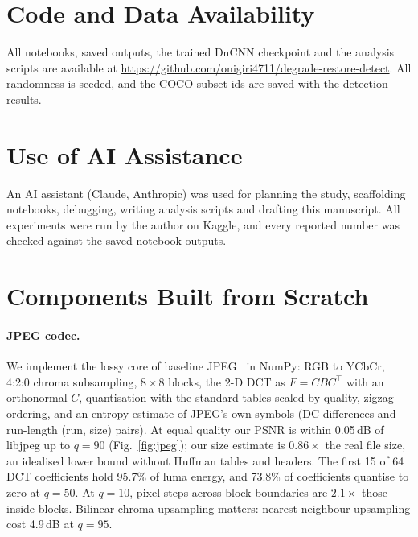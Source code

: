 \documentclass[11pt]{article}
\newcommand{\figref}[1]{Fig.~\ref{#1}}
\begin{document}
\section*{Code and Data Availability}
All notebooks, saved outputs, the trained DnCNN checkpoint and the analysis scripts are available at \url{https://github.com/onigiri4711/degrade-restore-detect}. All randomness is seeded, and the COCO subset ids are saved with the detection results.

\section*{Use of AI Assistance}
An AI assistant (Claude, Anthropic) was used for planning the study, scaffolding notebooks, debugging, writing analysis scripts and drafting this manuscript. All experiments were run by the author on Kaggle, and every reported number was checked against the saved notebook outputs.




\clearpage
\appendix

\section{Components Built from Scratch}
\label{app:scratch}

\paragraph{JPEG codec.} We implement the lossy core of baseline JPEG~\citep{wallace1992jpeg} in NumPy: RGB to YCbCr, 4:2:0 chroma subsampling, $8\times8$ blocks, the 2-D DCT as $F = C B C^\top$ with an orthonormal $C$, quantisation with the standard tables scaled by quality, zigzag ordering, and an entropy estimate of JPEG's own symbols (DC differences and run-length (run, size) pairs). At equal quality our PSNR is within 0.05\,dB of libjpeg up to $q=90$ (\figref{fig:jpeg}); our size estimate is $0.86\times$ the real file size, an idealised lower bound without Huffman tables and headers. The first 15 of 64 DCT coefficients hold 95.7\% of luma energy, and 73.8\% of coefficients quantise to zero at $q = 50$. At $q=10$, pixel steps across block boundaries are $2.1\times$ those inside blocks. Bilinear chroma upsampling matters: nearest-neighbour upsampling cost 4.9\,dB at $q = 95$.
\end{document}
